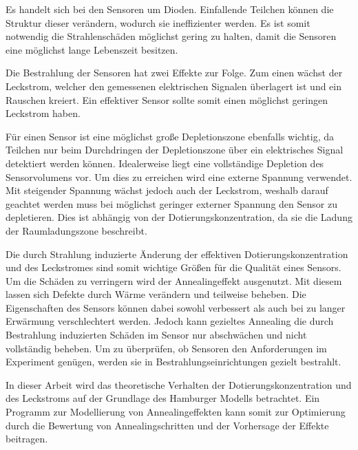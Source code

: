 Es handelt sich bei den Sensoren um Dioden.
Einfallende Teilchen können die
Struktur dieser verändern, wodurch sie ineffizienter werden.
Es ist somit notwendig die Strahlenschäden möglichst gering zu halten, damit
die Sensoren eine möglichst lange Lebenszeit besitzen.


Die Bestrahlung der Sensoren hat zwei Effekte zur Folge. Zum einen wächst der Leckstrom, welcher den
gemessenen elektrischen Signalen überlagert ist und ein Rauschen kreiert. Ein
effektiver Sensor sollte somit einen möglichst geringen Leckstrom haben.

Für einen Sensor ist eine möglichst große Depletionszone ebenfalls wichtig,
da Teilchen nur beim Durchdringen der Depletionszone über ein elektrisches Signal detektiert
werden können.
Idealerweise
liegt eine vollständige Depletion des Sensorvolumens vor. Um dies zu erreichen wird
eine externe Spannung verwendet. Mit steigender Spannung wächst jedoch auch der Leckstrom, weshalb
darauf geachtet werden muss bei möglichst geringer externer Spannung den Sensor zu depletieren.
Dies ist abhängig von der Dotierungskonzentration, da sie die Ladung der
Raumladungszone beschreibt.

Die durch Strahlung induzierte Änderung der effektiven Dotierungskonzentration und des Leckstromes sind
somit wichtige Größen für die Qualität eines Sensors.
Um die Schäden zu verringern wird der Annealingeffekt ausgenutzt. Mit diesem lassen sich
Defekte durch Wärme verändern und teilweise beheben. Die Eigenschaften des Sensors können
dabei sowohl verbessert als auch bei zu langer Erwärmung verschlechtert werden.
Jedoch kann gezieltes Annealing die durch Bestrahlung induzierten Schäden im Sensor nur
abschwächen und nicht vollständig beheben.
Um zu überprüfen, ob Sensoren den Anforderungen im Experiment genügen, werden sie in
Bestrahlungseinrichtungen gezielt bestrahlt.

In dieser Arbeit wird das
theoretische Verhalten der Dotierungskonzentration und des Leckstroms auf der Grundlage des Hamburger Modells betrachtet.
Ein Programm zur Modellierung von Annealingeffekten kann somit zur
Optimierung durch die Bewertung von Annealingschritten und der Vorhersage der Effekte beitragen.

